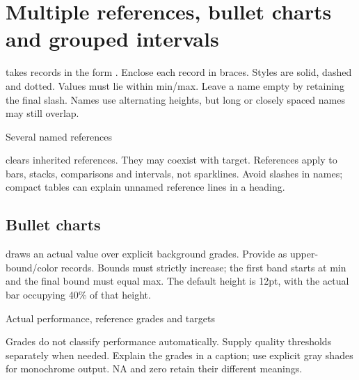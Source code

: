 
\section{Multiple references, bullet charts and grouped intervals}
 takes records in the form .
Enclose each record in braces. Styles are solid, dashed and dotted. Values must
lie within min/max. Leave a name empty by retaining the final slash.
Names use alternating heights, but long or closely spaced names may still overlap.
\begin{demo}{Several named references}
\end{demo}
 clears inherited references. They may coexist with target.
References apply to bars, stacks, comparisons and intervals, not sparklines.
Avoid slashes in names; compact tables can explain unnamed reference lines in a heading.

\subsection{Bullet charts}
 draws an actual value over explicit background grades.
Provide  as upper-bound/color records. Bounds must strictly
increase; the first band starts at min and the final bound must equal max.
The default height is 12pt, with the actual bar occupying 40\% of that height.
\begin{demo}{Actual performance, reference grades and targets}
\end{demo}
Grades do not classify performance automatically. Supply quality thresholds
separately when needed. Explain the grades in a caption; use explicit gray shades
for monochrome output. NA and zero retain their different meanings.

